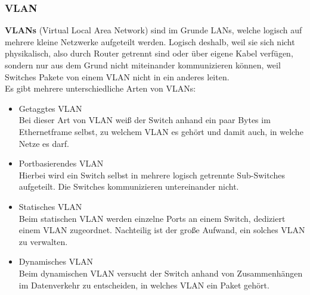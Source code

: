 \documentclass[12pt,a4paper]{report}
\begin{document}
\begin{onehalfspace}
\subsubsection{VLAN}\label{sssec:vlan}
\textbf{VLANs} (Virtual Local Area Network) sind im Grunde LANs, welche logisch auf mehrere kleine Netzwerke aufgeteilt werden. Logisch deshalb, weil sie sich nicht physikalisch, also durch Router getrennt sind oder über eigene Kabel verfügen, sondern nur aus dem Grund nicht miteinander kommunizieren können, weil Switches Pakete von einem VLAN nicht in ein anderes leiten.\\
Es gibt mehrere unterschiedliche Arten von VLANs:\\
\begin{itemize}
\item Getaggtes VLAN\\
Bei dieser Art von VLAN weiß der Switch anhand ein paar Bytes im Ethernetframe selbst, zu welchem VLAN es gehört und damit auch, in welche Netze es darf.
\item Portbasierendes VLAN\\
Hierbei wird ein Switch selbst in mehrere logisch getrennte Sub-Switches aufgeteilt. Die Switches kommunizieren untereinander nicht.
\item Statisches VLAN\\
Beim statischen VLAN werden einzelne Ports an einem Switch, dediziert einem VLAN zugeordnet. Nachteilig ist der große Aufwand, ein solches VLAN zu verwalten.
\item Dynamisches VLAN\\
Beim dynamischen VLAN versucht der Switch anhand von Zusammenhängen im Datenverkehr zu entscheiden, in welches VLAN ein Paket gehört. 
\end{itemize}


\end{onehalfspace}
\end{document}
